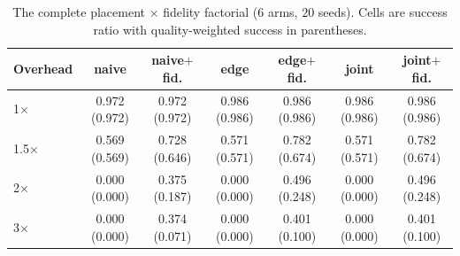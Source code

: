 \begin{table}
\centering
\footnotesize
\caption{The complete placement $\times$ fidelity factorial ($6$ arms, $20$ seeds). Cells are success ratio with quality-weighted success in parentheses.}
\label{tab:p2-factorial}
\begin{tabular}{lcccccc}
\toprule
Overhead & naive & naive$+$fid. & edge & edge$+$fid. & joint & joint$+$fid. \\
\midrule
1$\times$ & 0.972 (0.972) & 0.972 (0.972) & 0.986 (0.986) & 0.986 (0.986) & 0.986 (0.986) & 0.986 (0.986) \\
1.5$\times$ & 0.569 (0.569) & 0.728 (0.646) & 0.571 (0.571) & 0.782 (0.674) & 0.571 (0.571) & 0.782 (0.674) \\
2$\times$ & 0.000 (0.000) & 0.375 (0.187) & 0.000 (0.000) & 0.496 (0.248) & 0.000 (0.000) & 0.496 (0.248) \\
3$\times$ & 0.000 (0.000) & 0.374 (0.071) & 0.000 (0.000) & 0.401 (0.100) & 0.000 (0.000) & 0.401 (0.100) \\
\bottomrule
\end{tabular}
\par\vspace{2pt}{\footnotesize\raggedright Placement has three levels (simulator default, static edge tier, joint scorer) and the ladder has two. Every arm runs the same workload; only these two factors move.\par}
\end{table}
